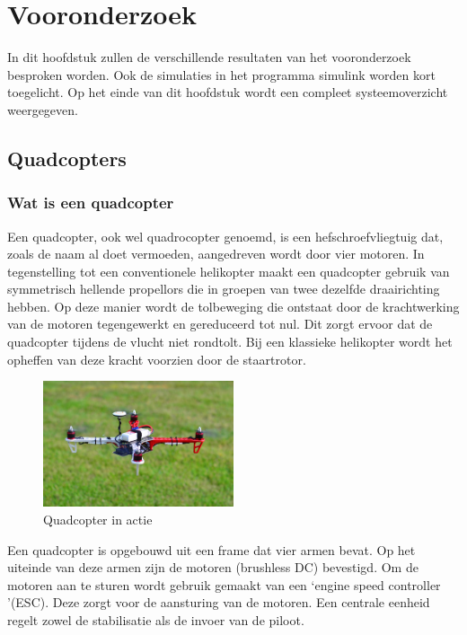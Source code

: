 \chapter{Vooronderzoek}

	\par In dit hoofdstuk zullen de verschillende resultaten van het vooronderzoek besproken worden. Ook de simulaties in het programma simulink worden kort toegelicht. Op het einde van dit hoofdstuk wordt een compleet systeemoverzicht weergegeven. 

	\section{Quadcopters}

		\subsection{Wat is een quadcopter}
			
			\par Een quadcopter, ook wel quadrocopter genoemd, is een hefschroefvliegtuig dat, zoals de naam al doet vermoeden, aangedreven wordt door vier motoren. In tegenstelling tot een conventionele helikopter maakt een quadcopter gebruik van symmetrisch hellende propellors die in groepen van twee dezelfde draairichting hebben. Op deze manier wordt de tolbeweging die ontstaat door de krachtwerking van de motoren tegengewerkt en gereduceerd tot nul. Dit zorgt ervoor dat de quadcopter tijdens de vlucht niet rondtolt. Bij een klassieke helikopter wordt het opheffen van deze kracht voorzien door de staartrotor.

				\begin{figure}[H]					  
					  \centering
					  \includegraphics[width=0.5\textwidth]{Vooronderzoek/quad_foto.png}
					  \caption{Quadcopter in actie}
					  \label{quadcopter_foto}
				\end{figure}

			\par Een quadcopter is opgebouwd uit een frame dat vier armen bevat. Op het uiteinde van deze armen zijn de motoren (brushless DC) bevestigd. Om de motoren aan te sturen wordt gebruik gemaakt van een \textquoteleft engine speed controller \textquoteright (ESC). Deze zorgt voor de aansturing van de motoren. Een centrale eenheid regelt zowel de stabilisatie als de invoer van de piloot.

